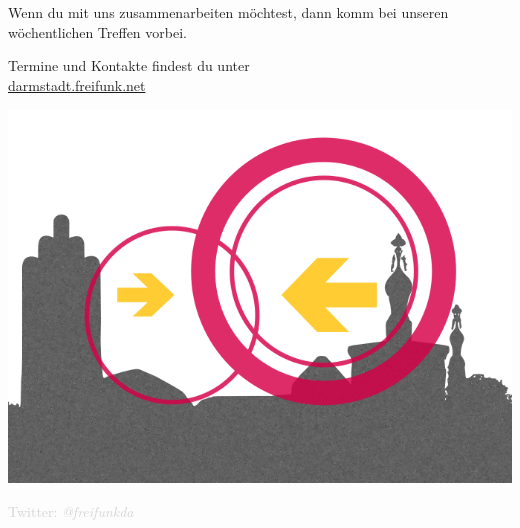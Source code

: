 \documentclass[a4paper]{article}
\begin{document}
\vspace{1.3cm}
\begin{Row}
    \begin{Cell}{1}
	Wenn du mit uns zusammenarbeiten möchtest, dann komm bei unseren wöchentlichen Treffen vorbei.
	\end{Cell}
\end{Row}
\vspace{0.5cm}
\begin{center}
	\large Termine und Kontakte findest du unter \\
	\url{darmstadt.freifunk.net}
\end{center}
\begin{center}
\vspace{-0.5cm}
\hspace*{-0.05 \paperwidth}\includegraphics[width=\paperwidth]{../images/logo_skyline_large}

\vspace{-2.7cm}
\large \textcolor{lightgrey}{Twitter: \textit{@freifunkda}}
\end{center}
\end{document}
